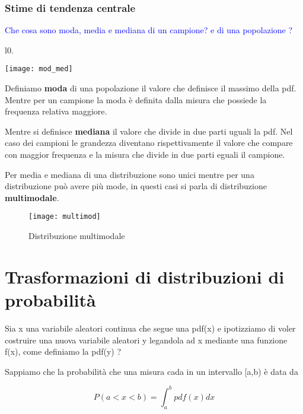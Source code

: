 \subsubsection{Stime di tendenza centrale}

\textcolor{blue}{Che cosa sono moda, media e mediana di un campione? e di una popolazione ?}


\begin{wrapfigure}[8]{l}{0.\textwidth}

\centering

\texttt{[image: mod\_med]}	

\end{wrapfigure}


\noindent Definiamo \textbf{moda} di una popolazione il valore che definisce il massimo della pdf. Mentre per un campione la moda \`{e} definita dalla misura che possiede la frequenza relativa maggiore.\newline

\noindent Mentre si definisce \textbf{mediana} il valore che  divide in due parti uguali la pdf. Nel caso dei campioni le grandezza diventano rispettivamente il valore che compare con maggior frequenza e la misura che divide in due parti eguali il campione.

Per media e mediana di una distribuzione sono unici mentre per una distribuzione pu\`{o} avere pi\`{u} mode, in questi casi si parla di distribuzione \textbf{multimodale}.

 
\begin{figure}[ht]
\vspace{0.3in}
\texttt{[image: multimod]}	
\centering
\vspace{0.3in}
\caption{Distribuzione multimodale}
\end{figure}

\section{Trasformazioni di distribuzioni di probabilit\`{a}}

Sia x una variabile aleatori continua  che segue una pdf(x) e ipotizziamo di voler costruire una nuova variabile aleatori y legandola ad x mediante una funzione f(x), come definiamo la pdf(y) ?

Sappiamo che la probabilit\`{a} che una misura cada in un intervallo [a,b) \`{e} data da 

\begin{equation*}
	P(a < x< b) = \int_{a}^{b}{pdf(x)dx}
\end{equation*}
\newline


